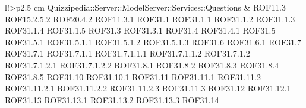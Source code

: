 \begin{tabella}{l!{\VRule}>{\centering\arraybackslash}p{2.5 cm}}
Quizzipedia::Server::ModelServer::Services::Questions & ROF11.3 \linebreak ROF15.2.5.2 \linebreak RDF20.4.2 \linebreak ROF11.3.1 \linebreak ROF31.1 \linebreak ROF31.1.1 \linebreak ROF31.1.2 \linebreak ROF31.1.3 \linebreak ROF31.1.4 \linebreak ROF31.1.5 \linebreak ROF31.3 \linebreak ROF31.3.1 \linebreak ROF31.4 \linebreak ROF31.4.1 \linebreak ROF31.5 \linebreak ROF31.5.1 \linebreak ROF31.5.1.1 \linebreak ROF31.5.1.2 \linebreak ROF31.5.1.3 \linebreak ROF31.6 \linebreak ROF31.6.1 \linebreak ROF31.7 \linebreak ROF31.7.1 \linebreak ROF31.7.1.1 \linebreak ROF31.7.1.1.1 \linebreak ROF31.7.1.1.2 \linebreak ROF31.7.1.2 \linebreak ROF31.7.1.2.1 \linebreak ROF31.7.1.2.2 \linebreak ROF31.8.1 \linebreak ROF31.8.2 \linebreak ROF31.8.3 \linebreak ROF31.8.4 \linebreak ROF31.8.5 \linebreak ROF31.10 \linebreak ROF31.10.1 \linebreak ROF31.11 \linebreak ROF31.11.1 \linebreak ROF31.11.2 \linebreak ROF31.11.2.1 \linebreak ROF31.11.2.2 \linebreak ROF31.11.2.3 \linebreak ROF31.11.3 \linebreak ROF31.12 \linebreak ROF31.12.1 \linebreak ROF31.13 \linebreak ROF31.13.1 \linebreak ROF31.13.2 \linebreak ROF31.13.3 \linebreak ROF31.14 \linebreak 
\end{tabella}
